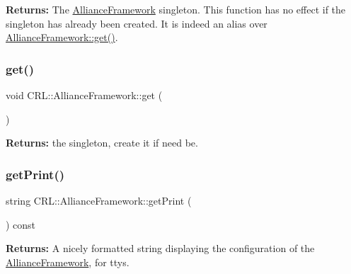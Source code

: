 {\bfseries Returns\+:} The \mbox{\hyperlink{classCRL_1_1AllianceFramework}{Alliance\+Framework}} singleton. This function has no effect if the singleton has already been created. It is indeed an alias over \mbox{\hyperlink{classCRL_1_1AllianceFramework_a976479af696a86c998c10d9d2604839d}{Alliance\+Framework\+::get()}}. \mbox{\label{classCRL_1_1AllianceFramework_a976479af696a86c998c10d9d2604839d}} 
\subsubsection{\texorpdfstring{get()}{get()}}
{\footnotesize\ttfamily void C\+R\+L\+::\+Alliance\+Framework\+::get (\begin{DoxyParamCaption}{ }\end{DoxyParamCaption})\hspace{0.3cm}{\ttfamily [static]}}

{\bfseries Returns\+:} the singleton, create it if need be. \mbox{\label{classCRL_1_1AllianceFramework_ab142ba712b0e6388e45bb8d2fa05d93e}} 
\subsubsection{\texorpdfstring{get\+Print()}{getPrint()}}
{\footnotesize\ttfamily string C\+R\+L\+::\+Alliance\+Framework\+::get\+Print (\begin{DoxyParamCaption}{ }\end{DoxyParamCaption}) const}

{\bfseries Returns\+:} A nicely formatted string displaying the configuration of the \mbox{\hyperlink{classCRL_1_1AllianceFramework}{Alliance\+Framework}}, for ttys. \mbox{\label{classCRL_1_1AllianceFramework_adc7dc5aa7e84b1fd94bc4a29bc6260e1}} 
